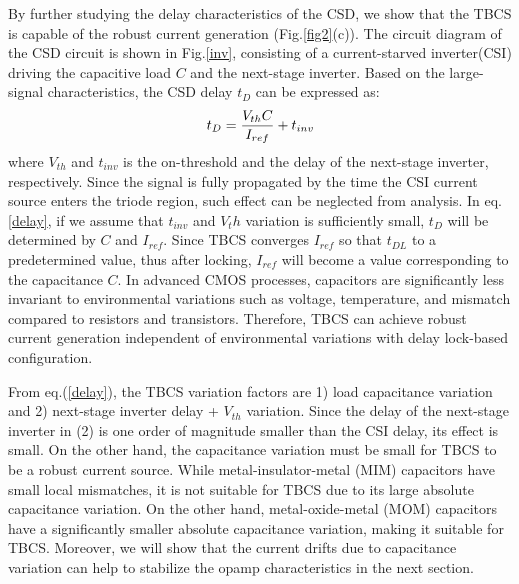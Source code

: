 \documentclass[letterpaper, 10 pt, conference]{ieeeconf}  %
\begin{document}
By further studying the delay characteristics of the CSD, we show that the TBCS is capable of the robust current generation (Fig.\ref{fig2}(c)).
The circuit diagram of the CSD circuit is shown in Fig.\ref{inv}, consisting of a current-starved inverter(CSI)\cite{mroszczyk2014tunable} driving the capacitive load $C$ and the next-stage inverter. Based on the large-signal characteristics, the CSD delay $t_D$ can be expressed as: 
\begin{eqnarray}
    \centering
    t_D = \frac{V_{th}C}{I_{ref}}+t_{inv}
    \label{delay}
\end{eqnarray}
where $V_{th}$ and $t_{inv}$ is the on-threshold and the delay of the next-stage inverter, respectively.  Since the signal is fully propagated by the time the CSI current source enters the triode region, such effect can be neglected from analysis. In eq.\ref{delay}, if we assume that $t_{inv}$ and $V_th$ variation is sufficiently small, $t_D$ will be determined by $C$ and $I_{ref}$. 
Since TBCS converges $I_{ref}$ so that $t_{DL}$ to a predetermined value, thus after locking, $I_{ref}$ will become a value corresponding to the capacitance $C$. In advanced CMOS processes, capacitors are significantly less invariant to environmental variations such as voltage, temperature, and mismatch compared to resistors and transistors. Therefore, TBCS can achieve robust current generation independent of environmental variations with delay lock-based configuration.


From eq.(\ref{delay}), the TBCS variation factors are 1) load capacitance variation and 2) next-stage inverter delay + $V_{th}$ variation.
Since the delay of the next-stage inverter in (2) is one order of magnitude smaller than the CSI delay, its effect is small. On the other hand, the capacitance variation must be small for TBCS to be a robust current source. While metal-insulator-metal (MIM) capacitors have small local mismatches, it is not suitable for TBCS due to its large absolute capacitance variation. On the other hand, metal-oxide-metal (MOM) capacitors have a significantly smaller absolute capacitance variation, making it suitable for TBCS. Moreover, we will show that the current drifts due to capacitance variation can help to stabilize the opamp characteristics in the next section.
\end{document}
